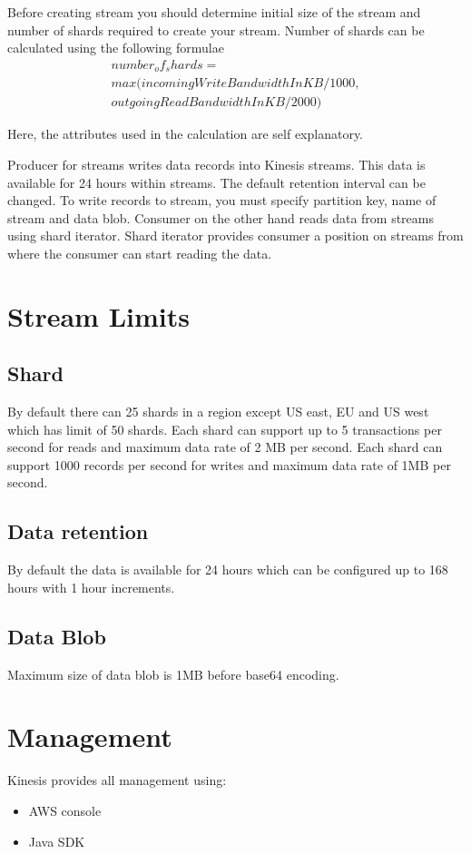\documentclass[9pt,twocolumn,twoside]{../../styles/osajnl}
\begin{document}
Before creating stream you should determine initial size of the stream \cite{www-kinesis-size} and number of shards required to create your stream. Number of shards can be calculated using the following formulae
\begin{multline*} 
number_of_shards = \\
   max ( 
   incomingWriteBandwidthInKB/1000, \\
   outgoingReadBandwidthInKB/2000
   )
\end{multline*}

Here, the attributes used in the calculation are self explanatory.

Producer for streams writes data records into Kinesis streams. This data is available for 24 hours within streams. The default retention interval can be changed. To write records to stream, you must specify partition key, name of stream and data blob. Consumer on the other hand reads data from streams using shard iterator. Shard iterator provides consumer a position on streams from where the consumer can start reading the data.

\section{Stream Limits}
\subsection{Shard}
By default there can 25 shards in a region except US east, EU and US west which has limit of 50 shards. Each shard can support up to 5 transactions per second for reads and maximum data rate of 2 MB per second. Each shard can support 1000 records per second for writes and maximum data rate of 1MB per second.

\subsection{Data retention}
By default the data is available for 24 hours which can be configured up to 168 hours with 1 hour increments.

\subsection{Data Blob}
Maximum size of data blob is 1MB before base64 encoding.

\section{Management}
Kinesis provides all management using:
\begin{itemize}
	\item  AWS console
	\item Java SDK \cite{www-kinesis-javasdk} 
\end{itemize}
\end{document}
